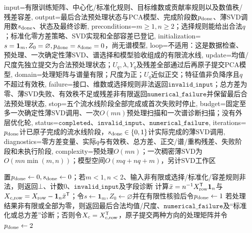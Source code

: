 \begin{AlgorithmContract}{
  input={有限训练矩阵、中心化/标准化规则、目标维数或贡献率规则以及数值秩/残差容差},
  output={最后合法预处理状态与PCA模型、完成阶段数$p_{\rm done}$、薄SVD调用数$s_{\rm done}$、状态及最终诊断},
  preconditions={$m\ge1,n\ge2$；选择规则能给出合法$q$；标准化零方差策略、SVD实现和全部容差已登记},
  initialization={$s=\mathbf1_m,Z_0=\varnothing,p_{\rm done}=s_{\rm done}=0$，尚无谱模型},
  loop={不适用：这是数据检查、预处理、一次确定性薄SVD、谱选择和模型验收组成的有限流水线},
  update={均值/尺度先独立提交为合法预处理状态；$U_q,\lambda,Y_q$及残差全部通过后再原子提交PCA模型},
  domain={处理矩阵与谱量有限；尺度为正；$U_q$近似正交；特征值非负降序且$q$不超过有效秩},
  failure={接口、维数或选择规则非法返回$\mathtt{invalid\_input}$；总方差为零、薄SVD失败、有效秩不足或残差非有限返回$\mathtt{numerical\_failure}$并保留最后合法预处理状态},
  stop={五个流水线阶段全部完成或首次失败时停止},
  budget={固定至多一次确定性薄SVD调用、一次$O(mn)$预处理扫描和一次谱诊断扫描；没有外层优化轮},
  status={$\mathtt{completed}$、$\mathtt{invalid\_input}$、$\mathtt{numerical\_failure}$},
  iterations={$p_{\rm done}$计已原子完成的流水线阶段，$s_{\rm done}\in\{0,1\}$计实际完成的薄SVD调用},
  diagnostics={零方差变量、实际$q$与有效秩、总方差、正交/谱/重构残差、失败阶段和未执行阶段},
  complexity={预处理$O(mn)$；一次稠密薄SVD为$O(mn\min(m,n))$；模型空间$O(mq+nq+m)$，另计SVD工作区}
}
\begin{algorithm}[!t]
\caption{中心化样本的主成分分析}\label{alg:V4-C04-pca}
置$p_{\rm done}\leftarrow0,s_{\rm done}\leftarrow0$；若$m<1,n<2$、输入非有限或选择/标准化/容差规则非法，则返回$\bot$、计数$0$、$\mathtt{invalid\_input}$及字段诊断\;
计算$\bar x=n^{-1}X_{\rm row}^{\mathsf T}\boldsymbol1_n$与$X_{c,{\rm row}}=X_{\rm row}-\boldsymbol1_n\bar x^{\mathsf T}$；令$s\leftarrow\mathbf1_m,Z_0\leftarrow\varnothing$并在有限性核验后令$p_{\rm done}\leftarrow1$\;
若处理结果非有限或全部为零，则返回最后合法均值/尺度、$\mathtt{numerical\_failure}$及“标准化或总方差”诊断；否则令$X_c=X_{c,{\rm row}}^{\mathsf T}$，原子提交两种方向的处理矩阵并令$p_{\rm done}\leftarrow2$\;

\end{algorithm}
\end{AlgorithmContract}
